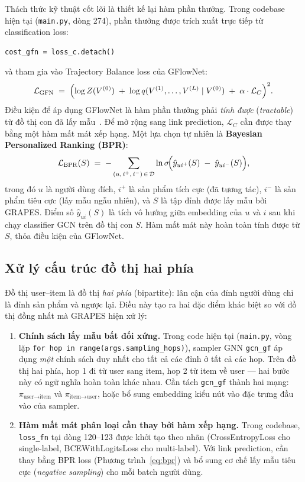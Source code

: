 Thách thức kỹ thuật cốt lõi là thiết kế lại hàm phần thưởng. Trong codebase hiện tại (\texttt{main.py}, dòng 274), phần thưởng được trích xuất trực tiếp từ classification loss:
\begin{verbatim}
cost_gfn = loss_c.detach()
\end{verbatim}
và tham gia vào Trajectory Balance loss của GFlowNet:
\begin{equation}
    \mathcal{L}_{\mathrm{GFN}} \;=\; \Bigl(\log Z(V^{(0)}) \;+\; \log q(V^{(1)},\ldots,V^{(L)}\mid V^{(0)}) \;+\; \alpha \cdot \mathcal{L}_C\Bigr)^2.
\end{equation}
Điều kiện để áp dụng GFlowNet là hàm phần thưởng phải \textit{tính được} (\textit{tractable}) từ đồ thị con đã lấy mẫu~\cite{Younesian2023GRAPES, Bengio2021GFlowNet}. Để mở rộng sang link prediction, $\mathcal{L}_C$ cần được thay bằng một hàm mất mát xếp hạng. Một lựa chọn tự nhiên là \textbf{Bayesian Personalized Ranking (BPR)}:
\begin{equation}
    \mathcal{L}_{\mathrm{BPR}}(S) \;=\; -\sum_{(u,\,i^+,\,i^-)\,\in\,\mathcal{D}} \ln\sigma\!\Bigl(\hat{y}_{u i^+}(S) \;-\; \hat{y}_{u i^-}(S)\Bigr),
    \label{eq:bpr}
\end{equation}
trong đó $u$ là người dùng đích, $i^+$ là sản phẩm tích cực (đã tương tác), $i^-$ là sản phẩm tiêu cực (lấy mẫu ngẫu nhiên), và $S$ là tập đỉnh được lấy mẫu bởi GRAPES. Điểm số $\hat{y}_{u i}(S)$ là tích vô hướng giữa embedding của $u$ và $i$ sau khi chạy classifier GCN trên đồ thị con $S$. Hàm mất mát này hoàn toàn tính được từ $S$, thỏa điều kiện của GFlowNet.

\subsection{Xử lý cấu trúc đồ thị hai phía}

Đồ thị user--item là đồ thị \textit{hai phía} (bipartite): lân cận của đỉnh người dùng chỉ là đỉnh sản phẩm và ngược lại. Điều này tạo ra hai đặc điểm khác biệt so với đồ thị đồng nhất mà GRAPES hiện xử lý:

\begin{enumerate}
    \item \textbf{Chính sách lấy mẫu bất đối xứng.} Trong code hiện tại (\texttt{main.py}, vòng lặp \texttt{for hop in range(args.sampling\_hops)}), sampler GNN \texttt{gcn\_gf} áp dụng \textit{một} chính sách duy nhất cho tất cả các đỉnh ở tất cả các hop. Trên đồ thị hai phía, hop 1 đi từ user sang item, hop 2 từ item về user --- hai bước này có ngữ nghĩa hoàn toàn khác nhau. Cần tách \texttt{gcn\_gf} thành hai mạng: $\pi_{\text{user}\to\text{item}}$ và $\pi_{\text{item}\to\text{user}}$, hoặc bổ sung embedding kiểu nút vào đặc trưng đầu vào của sampler.

    \item \textbf{Hàm mất mát phân loại cần thay bởi hàm xếp hạng.} Trong codebase, \texttt{loss\_fn} tại dòng 120--123 được khởi tạo theo nhãn (CrossEntropyLoss cho single-label, BCEWithLogitsLoss cho multi-label). Với link prediction, cần thay bằng BPR loss (Phương trình~\ref{eq:bpr}) và bổ sung cơ chế lấy mẫu tiêu cực (\textit{negative sampling}) cho mỗi batch người dùng.
\end{enumerate}

